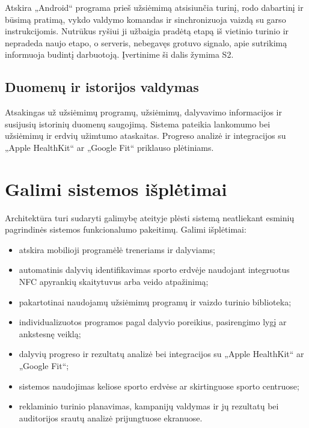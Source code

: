 \documentclass[a4paper,11pt]{article}
\begin{document}
Atskira „Android“ programa prieš užsiėmimą atsisiunčia turinį, rodo dabartinį ir būsimą pratimą, vykdo valdymo komandas ir sinchronizuoja vaizdą su garso instrukcijomis. Nutrūkus ryšiui ji užbaigia pradėtą etapą iš vietinio turinio ir nepradeda naujo etapo, o serveris, nebegavęs grotuvo signalo, apie sutrikimą informuoja budintį darbuotoją. Įvertinime ši dalis žymima S2.

\subsection{Duomenų ir istorijos valdymas}

Atsakingas už užsiėmimų programų, užsiėmimų, dalyvavimo informacijos ir susijusių istorinių duomenų saugojimą. Sistema pateikia lankomumo bei užsiėmimų ir erdvių užimtumo ataskaitas. Progreso analizė ir integracijos su „Apple HealthKit“ ar „Google Fit“ priklauso plėtiniams.

\section{Galimi sistemos išplėtimai}

Architektūra turi sudaryti galimybę ateityje plėsti sistemą neatliekant esminių pagrindinės sistemos funkcionalumo pakeitimų. Galimi išplėtimai:

\begin{itemize}
    \item atskira mobilioji programėlė treneriams ir dalyviams;
    \item automatinis dalyvių identifikavimas sporto erdvėje naudojant integruotus NFC apyrankių skaitytuvus arba veido atpažinimą;
    \item pakartotinai naudojamų užsiėmimų programų ir vaizdo turinio biblioteka;
    \item individualizuotos programos pagal dalyvio poreikius, pasirengimo lygį ar ankstesnę veiklą;
    \item dalyvių progreso ir rezultatų analizė bei integracijos su „Apple HealthKit“ ar „Google Fit“;
    \item sistemos naudojimas keliose sporto erdvėse ar skirtinguose sporto centruose;
    \item reklaminio turinio planavimas, kampanijų valdymas ir jų rezultatų bei auditorijos srautų analizė prijungtuose ekranuose.
\end{itemize}
\end{document}
